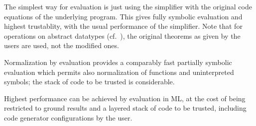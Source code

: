 \begin{isabellebody}
\begin{isamarkuptext}
\begin{description}
  \end{description}%
\end{isamarkuptext}%
\isamarkuptrue%
%
\isamarkuptrue%
%
\begin{isamarkuptext}%
The simplest way for evaluation is just using the simplifier with
  the original code equations of the underlying program.  This gives
  fully symbolic evaluation and highest trustablity, with the usual
  performance of the simplifier.  Note that for operations on abstract
  datatypes (cf.~), the original theorems as
  given by the users are used, not the modified ones.%
\end{isamarkuptext}%
\isamarkuptrue%
%
\isamarkuptrue%
%
\begin{isamarkuptext}%
Normalization by evaluation \cite{Aehlig-Haftmann-Nipkow:2008:nbe}
  provides a comparably fast partially symbolic evaluation which
  permits also normalization of functions and uninterpreted symbols;
  the stack of code to be trusted is considerable.%
\end{isamarkuptext}%
\isamarkuptrue%
%
\isamarkuptrue%
%
\begin{isamarkuptext}%
Highest performance can be achieved by evaluation in ML, at the cost
  of being restricted to ground results and a layered stack of code to
  be trusted, including code generator configurations by the user.


\end{isamarkuptext}
\end{isabellebody}
